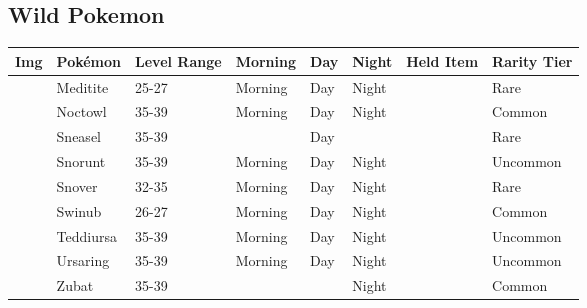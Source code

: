 \subsection{Wild Pokemon}%
\label{subsec:WildPokemon}%
\begin{longtable}{||l l l l l l l l||}%
\hline%
Img&Pokémon&Level Range&Morning&Day&Night&Held Item&Rarity Tier\\%
\hline%
\endhead%
\hline%
&Meditite&25{-}27&Morning&Day&Night&&Rare\\%
\hline%
&Noctowl&35{-}39&Morning&Day&Night&&Common\\%
\hline%
&Sneasel&35{-}39&&Day&&&Rare\\%
\hline%
&Snorunt&35{-}39&Morning&Day&Night&&Uncommon\\%
\hline%
&Snover&32{-}35&Morning&Day&Night&&Rare\\%
\hline%
&Swinub&26{-}27&Morning&Day&Night&&Common\\%
\hline%
&Teddiursa&35{-}39&Morning&Day&Night&&Uncommon\\%
\hline%
&Ursaring&35{-}39&Morning&Day&Night&&Uncommon\\%
\hline%
&Zubat&35{-}39&&&Night&&Common\\%
\hline%
\end{longtable}
